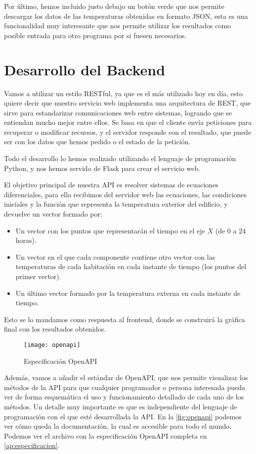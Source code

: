 Por último, hemos incluido justo debajo un botón verde que nos permite descargar los datos de las temperaturas obtenidas en formato JSON, esta es una funcionalidad muy interesante que nos permite utilizar los resultados como posible entrada para otro programa por si fuesen necesarios.

\section{Desarrollo del Backend}
Vamos a utilizar un estilo RESTful, ya que es el más utilizado hoy en día, esto quiere decir que nuestro servicio web implementa una arquitectura de REST, que sirve para estandarizar comunicaciones web entre sistemas, logrando que se entiendan mucho mejor entre ellos. Se basa en que el cliente envía peticiones para recuperar o modificar recursos, y el servidor responde con el resultado, que puede ser con los datos que hemos pedido o el estado de la petición.

Todo el desarrollo lo hemos realizado utilizando el lenguaje de programación Python, y nos hemos servido de Flask para crear el servicio web.

El objetivo principal de nuestra API es resolver sistemas de ecuaciones diferenciales, para ello recibimos del servidor web las ecuaciones, las condiciones iniciales y la función que representa la temperatura exterior del edificio, y devuelve un vector formado por:
\begin{itemize}
	\item Un vector con los puntos que representarán el tiempo en el eje $X$ (de $0$ a $24$ horas).
	\item Un vector en el que cada componente contiene otro vector con las temperaturas de cada habitación en cada instante de tiempo (los puntos del primer vector).
	\item Un último vector formado por la temperatura externa en cada instante de tiempo.
\end{itemize} 
Esto se lo mandamos como respuesta al frontend, donde se construirá la gráfica final con los resultados obtenidos.

\begin{figure}[h!]
	\centering
	\texttt{[image: openapi]}
	\caption{Especificación OpenAPI}
	\label{fig:openapi}
\end{figure}

Además, vamos a añadir el estándar de OpenAPI, que nos permite visualizar los métodos de la API para que cualquier programador o persona interesada pueda ver de forma esquemática el uso y funcionamiento detallado de cada uno de los métodos. Un detalle muy importante es que es independiente del lenguaje de programación con el que esté desarrollada la API. En la \autoref{fig:openapi} podemos ver cómo queda la documentación, la cual es accesible para todo el mundo. Podemos ver el archivo con la especificación OpenAPI completa en \autoref{ap:especificacion}.


